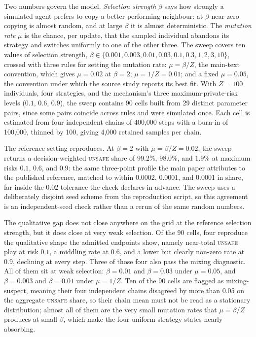 \documentclass{article}
\newcommand{\Unsafe}{\textsc{unsafe}}
\begin{document}
Two numbers govern the model. \emph{Selection strength} $\beta$ says how
strongly a simulated agent prefers to copy a better-performing neighbour: at
$\beta$ near zero copying is almost random, and at large $\beta$ it is almost
deterministic. The \emph{mutation rate} $\mu$ is the chance, per update, that
the sampled individual abandons its strategy and switches uniformly to one of
the other three. The sweep covers ten values of selection strength,
$\beta \in \{0.001, 0.003, 0.01, 0.03, 0.1, 0.3, 1, 2, 3, 10\}$, crossed with
three rules for setting the mutation rate: $\mu = \beta/Z$, the main-text
convention, which gives $\mu = 0.02$ at $\beta = 2$; $\mu = 1/Z = 0.01$; and a
fixed $\mu = 0.05$, the convention under which the source study reports its
best fit. With $Z = 100$ individuals, four strategies, and the mechanism's
three maximum-private-risk levels ($0.1$, $0.6$, $0.9$), the sweep contains
90 cells built from 29 distinct parameter pairs, since some pairs coincide
across rules and were simulated once. Each cell is estimated from four
independent chains of 400{,}000 steps with a burn-in of 100{,}000, thinned by
100, giving 4{,}000 retained samples per chain.

The reference setting reproduces. At $\beta = 2$ with $\mu = \beta/Z = 0.02$,
the sweep returns a decision-weighted \Unsafe{} share of 99.2\%, 98.0\%, and
1.9\% at maximum risks $0.1$, $0.6$, and $0.9$: the same three-point profile
the main paper attributes to the published reference, matched to within
0.0002, 0.0001, and 0.0001 in share, far inside the 0.02 tolerance the check
declares in advance. The sweep uses a deliberately disjoint seed scheme from
the reproduction script, so this agreement is an independent-seed check rather
than a rerun of the same random numbers.

The qualitative gap does not close anywhere on the grid at the reference
selection strength, but it does close at very weak selection. Of the 90 cells,
four reproduce the qualitative shape the admitted endpoints show, namely
near-total \Unsafe{} play at risk $0.1$, a middling rate at $0.6$, and a lower
but clearly non-zero rate at $0.9$, declining at every step. Three of those
four also pass the mixing diagnostic. All of them sit at weak selection:
$\beta = 0.01$ and $\beta = 0.03$ under $\mu = 0.05$, and $\beta = 0.003$ and
$\beta = 0.01$ under $\mu = 1/Z$. Ten of the 90 cells are flagged as
mixing-suspect, meaning their four independent chains disagreed by more than
0.05 on the aggregate \Unsafe{} share, so their chain mean must not be read as
a stationary distribution; almost all of them are the very small mutation
rates that $\mu = \beta/Z$ produces at small $\beta$, which make the four
uniform-strategy states nearly absorbing.
\end{document}
